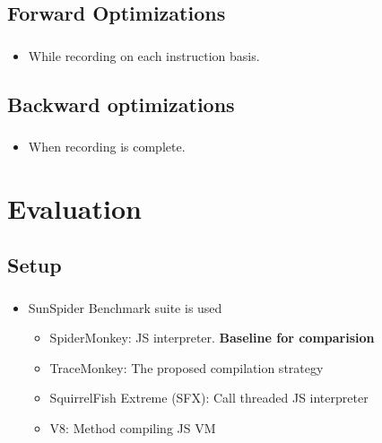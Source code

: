 \documentclass[mathserif,10pt]{beamer}
\begin{document}
\subsection{Forward Optimizations}
\frame
{
  \frametitle{\subsecname}
  \begin{itemize}
    \item While recording on each instruction basis.
  \end{itemize}  
}
\subsection{Backward optimizations}
\frame
{
  \frametitle{\subsecname}
  \begin{itemize}
    \item When recording is complete.
  \end{itemize}    
}

\section{Evaluation}
\subsection{Setup}
\frame
{
  \frametitle{\subsecname}
  \begin{itemize}
    \item SunSpider Benchmark suite is used
    \begin{itemize}
        \item SpiderMonkey: JS interpreter. \textbf{Baseline for comparision}
        \item TraceMonkey: The proposed compilation strategy
        \item SquirrelFish Extreme (SFX): Call threaded JS interpreter
        \item V8: Method compiling JS VM
    \end{itemize}
  \end{itemize}
}
\end{document}
